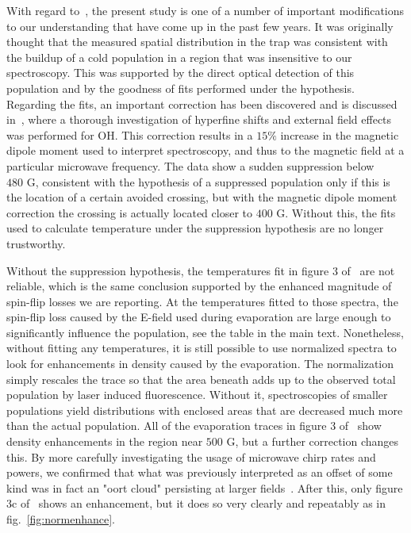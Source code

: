 \documentclass[%
 reprint,
 amsmath,amssymb,
 aps,
prl,
]{revtex4-1}
\begin{document}
With regard to~\cite{Stuhl2012evap}, the present study is one of a number of important modifications to our understanding that have come up in the past few years. 
It was originally thought that the measured spatial distribution in the trap was consistent with the buildup of a cold population in a region that was insensitive to our spectroscopy.
This was supported by the direct optical detection of this population and by the goodness of fits performed under the hypothesis.
Regarding the fits, an important correction has been discovered and is discussed in~\cite{Maeda2015}, where a thorough investigation of hyperfine shifts and external field effects was performed for OH.
This correction results in a $15\%$ increase in the magnetic dipole moment used to interpret spectroscopy, and thus to the magnetic field at a particular microwave frequency. 
The data show a sudden suppression below $480\text{ G}$, consistent with the hypothesis of a suppressed population only if this is the location of a certain avoided crossing, but with the magnetic dipole moment correction the crossing is actually located closer to $400\text{ G}$.
Without this, the fits used to calculate temperature under the suppression hypothesis are no longer trustworthy. 

Without the suppression hypothesis, the temperatures fit in figure 3 of~\cite{Stuhl2012evap} are not reliable, which is the same conclusion supported by the enhanced magnitude of spin-flip losses we are reporting.
At the temperatures fitted to those spectra, the spin-flip loss caused by the E-field used during evaporation are large enough to significantly influence the population, see the table in the main text.
Nonetheless, without fitting any temperatures, it is still possible to use normalized spectra to look for enhancements in density caused by the evaporation.
The normalization simply rescales the trace so that the area beneath adds up to the observed total population by laser induced fluorescence. 
Without it, spectroscopies of smaller populations yield distributions with enclosed areas that are decreased much more than the actual population.
All of the evaporation traces in figure 3 of~\cite{Stuhl2012evap} show density enhancements in the region near $500\text{ G}$, but a further correction changes this.
By more carefully investigating the usage of microwave chirp rates and powers, we confirmed that what was previously interpreted as an offset of some kind was in fact an "oort cloud" persisting at larger fields~\cite{Inguscio1999}.
After this, only figure 3c of~\cite{Sthul2012evap} shows an enhancement, but it does so very clearly and repeatably as in fig.~\ref{fig:normenhance}.
\end{document}
